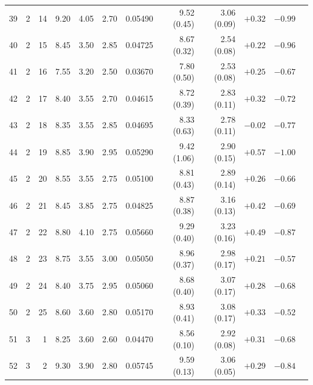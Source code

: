 \begin{longtable}{@{}rrrrrrrrrrrr@{}}
39 & 2 & 14 & \num{9.20} & \num{4.05} & \num{2.70} & \num{0.05490} & \num{9.52} (\num{0.45}) & \num{3.06} (\num{0.09}) & $+\num{0.32}$ & $-\num{0.99}$ &  \\
40 & 2 & 15 & \num{8.45} & \num{3.50} & \num{2.85} & \num{0.04725} & \num{8.67} (\num{0.32}) & \num{2.54} (\num{0.08}) & $+\num{0.22}$ & $-\num{0.96}$ &  \\
41 & 2 & 16 & \num{7.55} & \num{3.20} & \num{2.50} & \num{0.03670} & \num{7.80} (\num{0.50}) & \num{2.53} (\num{0.08}) & $+\num{0.25}$ & $-\num{0.67}$ &  \\
42 & 2 & 17 & \num{8.40} & \num{3.55} & \num{2.70} & \num{0.04615} & \num{8.72} (\num{0.39}) & \num{2.83} (\num{0.11}) & $+\num{0.32}$ & $-\num{0.72}$ &  \\
43 & 2 & 18 & \num{8.35} & \num{3.55} & \num{2.85} & \num{0.04695} & \num{8.33} (\num{0.63}) & \num{2.78} (\num{0.11}) & $-\num{0.02}$ & $-\num{0.77}$ &  \\
44 & 2 & 19 & \num{8.85} & \num{3.90} & \num{2.95} & \num{0.05290} & \num{9.42} (\num{1.06}) & \num{2.90} (\num{0.15}) & $+\num{0.57}$ & $-\num{1.00}$ &  \\
45 & 2 & 20 & \num{8.55} & \num{3.55} & \num{2.75} & \num{0.05100} & \num{8.81} (\num{0.43}) & \num{2.89} (\num{0.14}) & $+\num{0.26}$ & $-\num{0.66}$ &  \\
46 & 2 & 21 & \num{8.45} & \num{3.85} & \num{2.75} & \num{0.04825} & \num{8.87} (\num{0.38}) & \num{3.16} (\num{0.13}) & $+\num{0.42}$ & $-\num{0.69}$ &  \\
47 & 2 & 22 & \num{8.80} & \num{4.10} & \num{2.75} & \num{0.05660} & \num{9.29} (\num{0.40}) & \num{3.23} (\num{0.16}) & $+\num{0.49}$ & $-\num{0.87}$ &  \\
48 & 2 & 23 & \num{8.75} & \num{3.55} & \num{3.00} & \num{0.05050} & \num{8.96} (\num{0.37}) & \num{2.98} (\num{0.17}) & $+\num{0.21}$ & $-\num{0.57}$ &  \\
49 & 2 & 24 & \num{8.40} & \num{3.75} & \num{2.95} & \num{0.05060} & \num{8.68} (\num{0.40}) & \num{3.07} (\num{0.17}) & $+\num{0.28}$ & $-\num{0.68}$ &  \\
50 & 2 & 25 & \num{8.60} & \num{3.60} & \num{2.80} & \num{0.05170} & \num{8.93} (\num{0.41}) & \num{3.08} (\num{0.17}) & $+\num{0.33}$ & $-\num{0.52}$ &  \\
51 & 3 & 1 & \num{8.25} & \num{3.60} & \num{2.60} & \num{0.04470} & \num{8.56} (\num{0.10}) & \num{2.92} (\num{0.08}) & $+\num{0.31}$ & $-\num{0.68}$ &  \\
52 & 3 & 2 & \num{9.30} & \num{3.90} & \num{2.80} & \num{0.05745} & \num{9.59} (\num{0.13}) & \num{3.06} (\num{0.05}) & $+\num{0.29}$ & $-\num{0.84}$ &  \\

\end{longtable}
